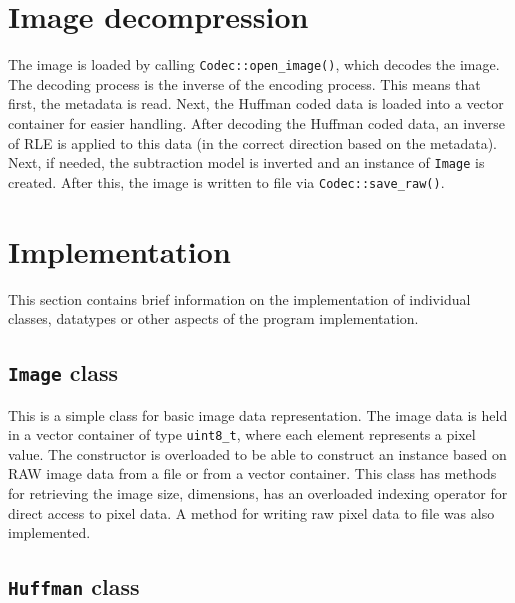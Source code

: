 \documentclass[pdftex, 11pt, a4paper, titlepage]{article}
\newcommand{\code}{\texttt}
\begin{document}
    \section{Image decompression}
    The image is loaded by calling \code{Codec::open\_image()}, which decodes the image.
    The decoding process is the inverse of the encoding process. This means that first, the metadata
    is read. Next, the Huffman coded data is loaded into a vector container for easier handling.
    After decoding the Huffman coded data, an inverse of RLE is applied to this data (in the correct
    direction based on the metadata). Next, if needed, the subtraction model is inverted and an instance
    of \code{Image} is created. After this, the image is written to file via \code{Codec::save\_raw()}.

    \section{Implementation}
    This section contains brief information on the implementation of individual classes, datatypes
    or other aspects of the program implementation.

    \subsection{\code{Image} class} \label{sec:Image_class}
    This is a simple class for basic image data representation. The image data is held in a vector
    container of type \code{uint8\_t}, where each element represents a pixel value. The constructor is
    overloaded to be able to construct an instance based on RAW image data from a file or from a vector
    container. This class has
    methods for retrieving the image size, dimensions, has an overloaded indexing operator for direct
    access to pixel data. A method for writing raw pixel data to file was also implemented.

    \subsection{\code{Huffman} class} \label{sec:Huffman_class}
\end{document}
